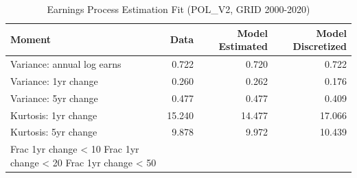 \begin{table}
\caption{Earnings Process Estimation Fit (POL_V2, GRID 2000-2020)}
\label{tab:earnings_fit_pol_v2}
\begin{tabular}{lrrr}
\toprule
Moment & Data & Model Estimated & Model Discretized \\
\midrule
Variance: annual log earns & 0.722 & 0.720 & 0.722 \\
Variance: 1yr change & 0.260 & 0.262 & 0.176 \\
Variance: 5yr change & 0.477 & 0.477 & 0.409 \\
Kurtosis: 1yr change & 15.240 & 14.477 & 17.066 \\
Kurtosis: 5yr change & 9.878 & 9.972 & 10.439 \\
Frac 1yr change < 10%
Frac 1yr change < 20%
Frac 1yr change < 50%
\bottomrule
\end{tabular}
\end{table}
